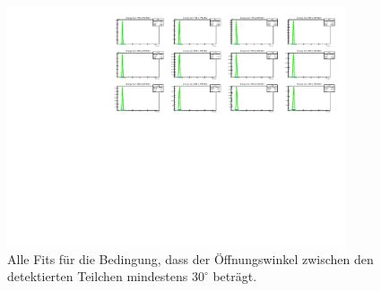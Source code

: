 \documentclass[a4paper,11pt,oneside,final,german,openbib,pdftex]{scrbook}
\begin{document}
{\begin{appendix}
\begin{figure}[h!]
	\begin{center}
		\includegraphics[width=100mm]{NewCalib/20171904SimMinOpeningAngleAllFits}
		\caption[Simulation: \"Offnungswinkel $>$ 30$^{\circ}$ alle Fits]{Alle Fits f\"ur die Bedingung, dass der \"Offnungswinkel zwischen den detektierten Teilchen mindestens $30^{\circ}$ betr\"agt.}
		\label{fig:Relative-Abweichung-Min-Opening-Angle-AllFits}
	\end{center}
\end{figure}



\listoffigures



\listoftables




\end{appendix}}
\end{document}
